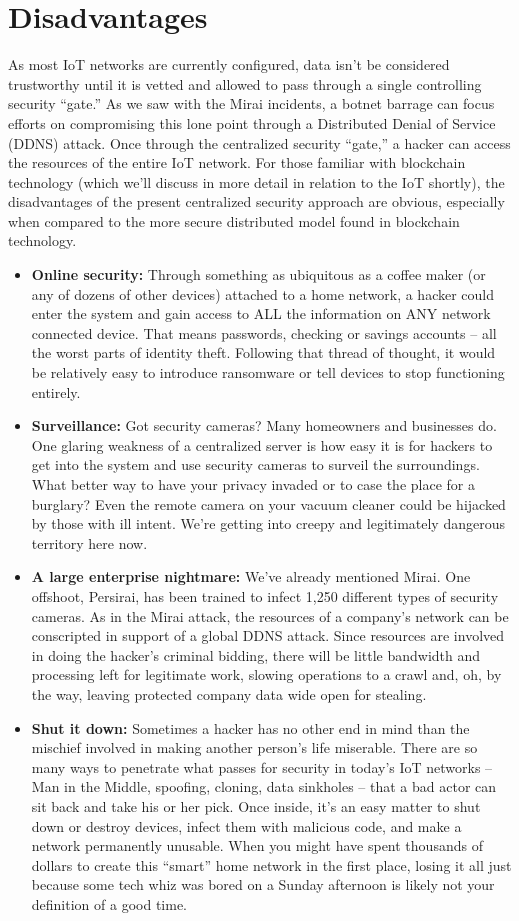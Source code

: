 \section{Disadvantages}
As most IoT networks are currently configured, data isn’t be considered trustworthy until it is vetted and allowed to pass through a single controlling security “gate.” As we saw with the Mirai incidents, a botnet barrage can focus efforts on compromising this lone point through a Distributed Denial of Service (DDNS) attack. Once through the centralized security “gate,” a hacker can access the resources of the entire IoT network. For those familiar with blockchain technology (which we’ll discuss in more detail in relation to the IoT shortly), the disadvantages of the present centralized security approach are obvious, especially when compared to the more secure distributed model found in blockchain technology.
\begin{itemize}
	\item[]   \textbf{Online security:} Through something as ubiquitous as a coffee maker (or any of dozens of other devices) attached to a home network, a hacker could enter the system and gain access to ALL the information on ANY network connected device. That means passwords, checking or savings accounts – all the worst parts of identity theft. Following that thread of thought, it would be relatively easy to introduce ransomware or tell devices to stop functioning entirely.
	\item[] \textbf{Surveillance:} Got security cameras? Many homeowners and businesses do. One glaring weakness of a centralized server is how easy it is for hackers to get into the system and use security cameras to surveil the surroundings. What better way to have your privacy invaded or to case the place for a burglary? Even the remote camera on your vacuum cleaner could be hijacked by those with ill intent. We’re getting into creepy and legitimately dangerous territory here now.
	\item[] \textbf{ A large enterprise nightmare:} We’ve already mentioned Mirai. One offshoot, Persirai, has been trained to infect 1,250 different types of security cameras. As in the Mirai attack, the resources of a company’s network can be conscripted in support of a global DDNS attack. Since resources are involved in doing the hacker’s criminal bidding, there will be little bandwidth and processing left for legitimate work, slowing operations to a crawl and, oh, by the way, leaving protected company data wide open for stealing.
	\item[] \textbf{Shut it down:} Sometimes a hacker has no other end in mind than the mischief involved in making another person’s life miserable. There are so many ways to penetrate what passes for security in today’s IoT networks – Man in the Middle, spoofing, cloning, data sinkholes – that a bad actor can sit back and take his or her pick. Once inside, it’s an easy matter to shut down or destroy devices, infect them with malicious code, and make a network permanently unusable. When you might have spent thousands of dollars to create this “smart” home network in the first place, losing it all just because some tech whiz was bored on a Sunday afternoon is likely not your definition of a good time.
\end{itemize}
